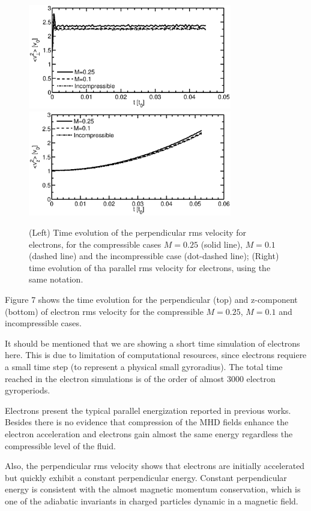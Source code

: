 \documentclass[%
aip,pop,amsmath,amssymb,
 reprint,%
]{revtex4-1}
\begin{document}
\begin{figure}[<t>]
\begin{center}
{\includegraphics[width = 3.5in]{./Figures/Fig7_a}}
{\includegraphics[width = 3.5in]{./Figures/Fig7_b}}
\caption{(Left) Time evolution of the perpendicular rms velocity for
electrons, for the compressible cases $M=0.25$ (solid line), 
$M=0.1$ (dashed line)
and the incompressible case (dot-dashed line); (Right) time evolution of
tha parallel rms velocity for electrons, using the same notation.} 
\end{center}
\label{mean square velocity}
\end{figure}

Figure 7 shows the time evolution for the perpendicular (top) 
and z-component (bottom) of electron
rms velocity for the compressible $M=0.25$, $M=0.1$ and incompressible cases.

It should be mentioned that we are showing
a short time simulation of electrons here.
This is due to limitation of computational resources, since electrons
requiere a small time step (to represent a physical 
small gyroradius).  The total time reached in the electron simulations
is of the order of almost 3000 
electron gyroperiods. 

Electrons present 
the typical parallel
energization reported in previous works. 
Besides there is no evidence that compression of 
the MHD fields enhance the electron acceleration and electrons gain 
almost the same energy
regardless the compressible level of the fluid.

Also, the
perpendicular rms velocity shows that electrons are initially accelerated 
but quickly exhibit a constant perpendicular energy. Constant 
perpendicular energy is consistent with the almost magnetic momentum 
conservation, 
which 
is one of the adiabatic invariants in charged particles dynamic in a magnetic 
field.
\end{document}

